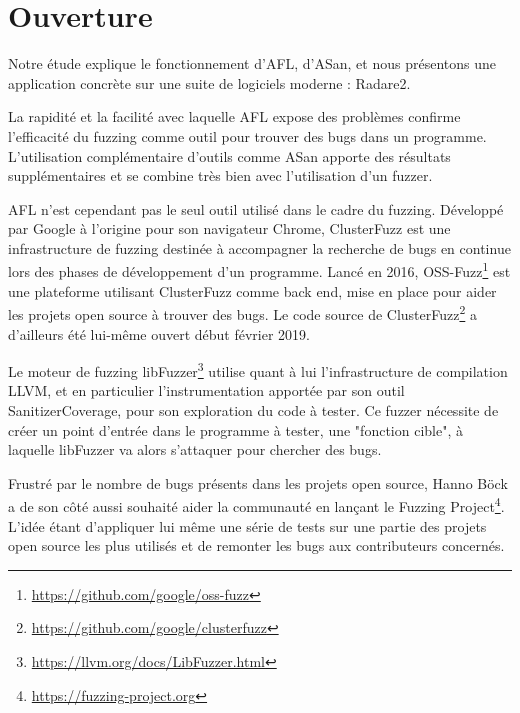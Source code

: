 \chapter{Ouverture}

Notre étude explique le fonctionnement d'AFL, d'ASan, et nous présentons une
application concrète sur une suite de logiciels moderne : Radare2.

La rapidité et la facilité avec laquelle AFL expose des problèmes confirme
l'efficacité du fuzzing comme outil pour trouver des bugs dans un programme.
L'utilisation complémentaire d'outils comme ASan apporte des résultats
supplémentaires et se combine très bien avec l'utilisation d'un fuzzer.

AFL n'est cependant pas le seul outil utilisé dans le cadre du fuzzing.
Développé par Google à l'origine pour son navigateur Chrome, ClusterFuzz
est une infrastructure de fuzzing destinée à accompagner la recherche de
bugs en continue lors des phases de développement d'un programme.
Lancé en 2016, OSS-Fuzz\footnote{\url{https://github.com/google/oss-fuzz}}
est une plateforme utilisant ClusterFuzz comme back end, mise en place pour
aider les projets open source à trouver des bugs. Le code source de
ClusterFuzz\footnote{\url{https://github.com/google/clusterfuzz}}
a d'ailleurs été lui-même ouvert début février 2019.

Le moteur de fuzzing libFuzzer\footnote{\url{https://llvm.org/docs/LibFuzzer.html}}
utilise quant à lui l'infrastructure de compilation LLVM, et en particulier
l'instrumentation apportée par son outil SanitizerCoverage, pour son
exploration du code à tester. Ce fuzzer nécessite de créer un point d'entrée
dans le programme à tester, une "fonction cible", à laquelle libFuzzer va
alors s'attaquer pour chercher des bugs.

Frustré par le nombre de bugs présents dans les projets open source, Hanno
Böck a de son côté aussi souhaité aider la communauté en lançant
le Fuzzing Project\footnote{\url{https://fuzzing-project.org}}. L'idée étant
d'appliquer lui même une série de tests sur une partie des projets open
source les plus utilisés et de remonter les bugs aux contributeurs concernés.
